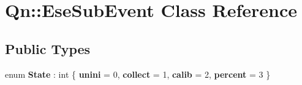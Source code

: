 \hypertarget{classQn_1_1EseSubEvent}{}\section{Qn\+:\+:Ese\+Sub\+Event Class Reference}
\label{classQn_1_1EseSubEvent}
\subsection*{Public Types}
\begin{DoxyCompactItemize}
\item 
\mbox{\label{classQn_1_1EseSubEvent_a2687faacf0aaaacd1a80bbc51614aa07}} 
enum {\bfseries State} \+: int \{ {\bfseries unini} = 0, 
{\bfseries collect} = 1, 
{\bfseries calib} = 2, 
{\bfseries percent} = 3
 \}
\end{DoxyCompactItemize}
